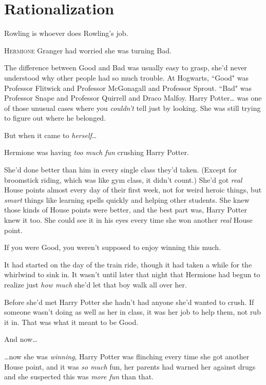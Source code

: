 \chapter{Rationalization}

\begin{chapterOpeningAuthorNote}
Rowling is whoever does Rowling's job.
\end{chapterOpeningAuthorNote}

\lettrine{H}{ermione} Granger had worried she was turning Bad.

\hplettrineextrapara
The difference between Good and Bad was usually easy to grasp, she'd never understood why other people had so much trouble. At Hogwarts, ``Good" was Professor Flitwick and Professor McGonagall and Professor Sprout. ``Bad" was Professor Snape and Professor Quirrell and Draco Malfoy. Harry Potter{\ldots} was one of those unusual cases where you \emph{couldn't} tell just by looking. She was still trying to figure out where he belonged.

But when it came to \emph{herself}{\ldots}

Hermione was having \emph{too much fun} crushing Harry Potter.

She'd done better than him in every single class they'd taken. (Except for broomstick riding, which was like gym class, it didn't count.) She'd got \emph{real} House points almost every day of their first week, not for weird heroic things, but \emph{smart} things like learning spells quickly and helping other students. She knew those kinds of House points were better, and the best part was, Harry Potter knew it too. She could see it in his eyes every time she won another \emph{real} House point.

If you were Good, you weren't supposed to enjoy winning this much.

It had started on the day of the train ride, though it had taken a while for the whirlwind to sink in. It wasn't until later that night that Hermione had begun to realize just \emph{how much} she'd let that boy walk all over her.

Before she'd met Harry Potter she hadn't had anyone she'd wanted to crush. If someone wasn't doing as well as her in class, it was her job to help them, not rub it in. That was what it meant to be Good.

And now{\ldots}

{\ldots}now she was \emph{winning}, Harry Potter was flinching every time she got another House point, and it was \emph{so much} fun, her parents had warned her against drugs and she suspected this was \emph{more fun} than that.

